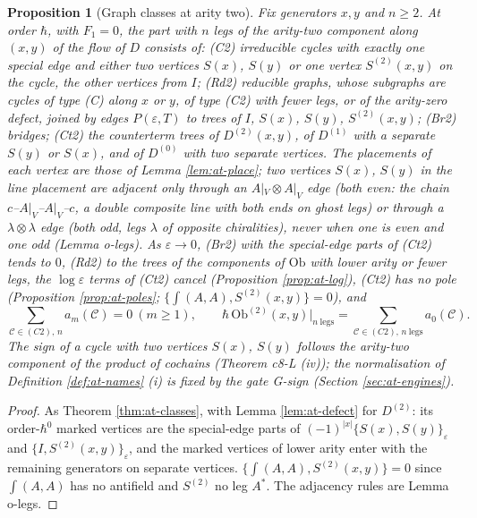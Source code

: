 \documentclass[11pt]{article}
\numberwithin{equation}{section}
\theoremstyle{plain}
\newtheorem{proposition}[theorem]{Proposition}
\theoremstyle{definition}
\newcommand{\AV}{A|_V}
\newcommand{\Ob}{\mathrm{Ob}}
\begin{document}
\begin{proposition}[Graph classes at arity two]
\label{prop:at-classes2}
Fix generators $x,y$ and $n\ge2$. At order $\hbar$, with $F_1=0$, the part with $n$ legs of the arity-two component along $(x,y)$ of the flow of $D$ consists of: (C2) irreducible cycles with exactly one special edge and either two vertices $S(x)$, $S(y)$ or one vertex $S^{(2)}(x,y)$ on the cycle, the other vertices from $I$; (Rd2) reducible graphs, whose subgraphs are cycles of type (C) along $x$ or $y$, of type (C2) with fewer legs, or of the arity-zero defect, joined by edges $P(\varepsilon,T)$ to trees of $I$, $S(x)$, $S(y)$, $S^{(2)}(x,y)$; (Br2) bridges; (Ct2) the counterterm trees of $D^{(2)}(x,y)$, of $D^{(1)}$ with a separate $S(y)$ or $S(x)$, and of $D^{(0)}$ with two separate vertices. The placements of each vertex are those of Lemma \ref{lem:at-place}; two vertices $S(x)$, $S(y)$ in the line placement are adjacent only through an $\AV\otimes\AV$ edge (both even: the chain $c$--$\AV$--$\AV$--$c$, a double composite line with both ends on ghost legs) or through a $\lambda\otimes\lambda$ edge (both odd, legs $\lambda$ of opposite chiralities), never when one is even and one odd (Lemma o-legs). As $\varepsilon\to0$, (Br2) with the special-edge parts of (Ct2) tends to $0$, (Rd2) to the trees of the components of $\Ob$ with lower arity or fewer legs, the $\log\varepsilon$ terms of (Ct2) cancel (Proposition \ref{prop:at-log}), (Ct2) has no pole (Proposition \ref{prop:at-poles}; $\{\int(A,A),S^{(2)}(x,y)\}=0$), and
\begin{equation}
\sum_{\mathcal C\in(C2),\,n}a_m(\mathcal C)=0\ (m\ge1),\qquad \hbar\,\Ob^{(2)}(x,y)\big|_{n\ \text{legs}}=\sum_{\mathcal C\in(C2),\,n\ \text{legs}}a_0(\mathcal C).
\label{eq:at-local2}
\end{equation}
The sign of a cycle with two vertices $S(x)$, $S(y)$ follows the arity-two component of the product of cochains (Theorem c8-L (iv)); the normalisation of Definition \ref{def:at-names} (i) is fixed by the gate G-sign (Section \ref{sec:at-engines}).
\end{proposition}

\begin{proof}
As Theorem \ref{thm:at-classes}, with Lemma \ref{lem:at-defect} for $D^{(2)}$: its order-$\hbar^0$ marked vertices are the special-edge parts of $(-1)^{|x|}\{S(x),S(y)\}_\varepsilon$ and $\{I,S^{(2)}(x,y)\}_\varepsilon$, and the marked vertices of lower arity enter with the remaining generators on separate vertices. $\{\int(A,A),S^{(2)}(x,y)\}=0$ since $\int(A,A)$ has no antifield and $S^{(2)}$ no leg $A^*$. The adjacency rules are Lemma o-legs.
\end{proof}
\end{document}
